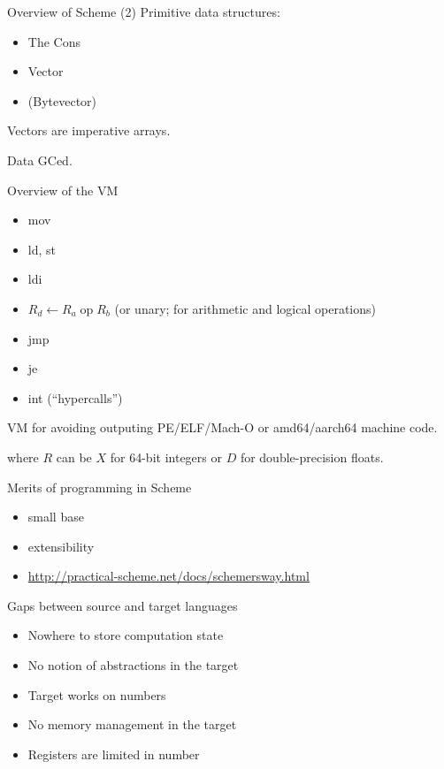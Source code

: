 \documentclass{beamer}
\begin{document}
\begin{frame}{Overview of Scheme (2)}
  Primitive data structures:
  \begin{itemize}
  \item The Cons
  \item Vector
  \item (Bytevector)
  \end{itemize}

  Vectors are imperative arrays.

  Data GCed.
\end{frame}

\begin{frame}{Overview of the VM}
  \begin{itemize}
  \item mov
  \item ld, st
  \item ldi
  \item $R_d\gets R_a\operatorname{op}R_b$ (or unary; for arithmetic and logical operations)
  \item jmp
  \item je
  \item int (``hypercalls'')
  \end{itemize}

  VM for avoiding outputing PE/ELF/Mach-O or amd64/aarch64 machine code.

  where $R$ can be $X$ for 64-bit integers or $D$ for double-precision floats.
\end{frame}

\begin{frame}{Merits of programming in Scheme}
  \begin{itemize}
  \item small base
  \item extensibility
  \item \url{http://practical-scheme.net/docs/schemersway.html}
  \end{itemize}
\end{frame}

\begin{frame}{Gaps between source and target languages}
  \begin{itemize}
  \item Nowhere to store computation state
  \item No notion of abstractions in the target
  \item Target works on numbers
  \item No memory management in the target
  \item Registers are limited in number
  \end{itemize}
\end{frame}
\end{document}
